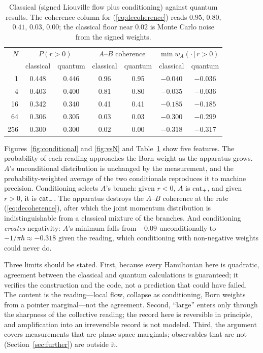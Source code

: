 \documentclass[12pt]{article}
\begin{document}
\begin{table}[!htbp]
\centering
\begin{tabular}{rcccccc}
\hline
$N$ & \multicolumn{2}{c}{$P(r>0)$} & \multicolumn{2}{c}{$A$--$B$ coherence} & \multicolumn{2}{c}{$\min w_A(\cdot\,|\,r>0)$} \\
 & classical & quantum & classical & quantum & classical & quantum \\
\hline
1   & 0.448 & 0.446 & 0.96 & 0.95 & $-0.040$ & $-0.036$ \\
4   & 0.403 & 0.400 & 0.81 & 0.80 & $-0.035$ & $-0.036$ \\
16  & 0.342 & 0.340 & 0.41 & 0.41 & $-0.185$ & $-0.185$ \\
64  & 0.306 & 0.305 & 0.03 & 0.03 & $-0.300$ & $-0.299$ \\
256 & 0.300 & 0.300 & 0.02 & 0.00 & $-0.318$ & $-0.317$ \\
\hline
\end{tabular}
\caption{Classical (signed Liouville flow plus conditioning) against quantum results.
The coherence column for (\ref{eq:decoherence}) reads $0.95$, $0.80$, $0.41$, $0.03$, $0.00$; the classical floor near $0.02$ is Monte Carlo noise from the signed weights.}
\label{tab:collapse}
\end{table}

Figures~\ref{fig:conditional} and \ref{fig:vsN} and Table~\ref{tab:collapse} show five features.
The probability of each reading approaches the Born weight as the apparatus grows.
$A$'s unconditional distribution is unchanged by the measurement, and the probability-weighted average of the two conditionals reproduces it to machine precision.
Conditioning selects $A$'s branch: given $r<0$, $A$ is ${\rm cat}_+$, and given $r>0$, it is ${\rm cat}_-$.
The apparatus destroys the $A$--$B$ coherence at the rate (\ref{eq:decoherence}), after which the joint momentum distribution is indistinguishable from a classical mixture of the branches.
And conditioning \emph{creates} negativity: $A$'s minimum falls from $-0.09$ unconditionally to $-1/\pi\hbar \approx -0.318$ given the reading, which conditioning with non-negative weights could never do.

Three limits should be stated.
First, because every Hamiltonian here is quadratic, agreement between the classical and quantum calculations is guaranteed; it verifies the construction and the code, not a prediction that could have failed.
The content is the reading---local flow, collapse as conditioning, Born weights from a pointer marginal---not the agreement.
Second, ``large'' enters only through the sharpness of the collective reading; the record here is reversible in principle, and amplification into an irreversible record is not modeled.
Third, the argument covers measurements that are phase-space marginals; observables that are not (Section~\ref{sec:further}) are outside it.
\end{document}
